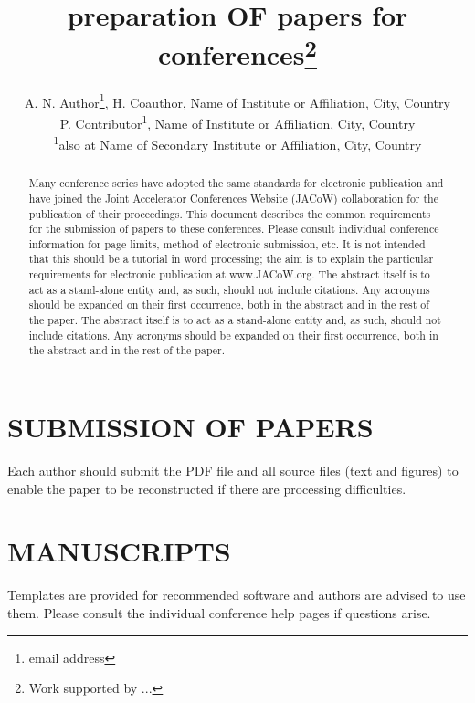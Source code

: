 \documentclass[a4paper,
               keeplastbox,   %
               ]{jacow}
\begin{document}
\title{preparation OF papers for  conferences\thanks{Work supported by ...}}

\author{A. N. Author\thanks{email address}, H. Coauthor, Name of Institute or Affiliation, City, Country \\
		P. Contributor\textsuperscript{1}, Name of Institute or Affiliation, City, Country \\
		\textsuperscript{1}also at Name of Secondary Institute or Affiliation, City, Country}
	
\maketitle

%
\begin{abstract}
   Many conference series have adopted the same standards
   for electronic publication and have joined the Joint
   Accelerator Conferences Website (JACoW) collaboration
   for the publication of their proceedings. This document
   describes the common requirements for the submission of
   papers to these conferences. Please consult individual
   conference information for page limits, method of electronic
   submission, etc. It is not intended that this should
   be a tutorial in word processing; the aim is to explain the
   particular requirements for electronic publication at
   www.JACoW.org. The abstract itself is to act as a stand-alone
   entity and, as such, should not include citations. Any acronyms 
   should be expanded on their first occurrence, both in the 
   abstract and in the rest of the paper. 
   The abstract itself is to act as a stand-alone entity and, 
   as such, should not include citations. Any acronyms should 
   be expanded on their first occurrence, both in the abstract 
   and in the rest of the paper.
\end{abstract}


\section{SUBMISSION OF PAPERS}
Each author should submit the PDF file and all source
files (text and figures) to enable the paper to be
reconstructed if there are processing difficulties.

\section{MANUSCRIPTS}
Templates are provided for recommended software and
authors are advised to use them. Please consult the
individual conference help pages if questions arise.
\end{document}
